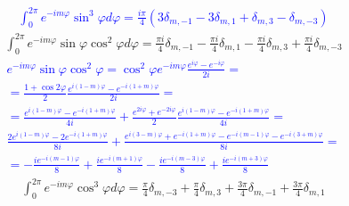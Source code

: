 %
\textcolor{blue}{ \begin{equation*} \begin{aligned}
\int_{0}^{2\pi} e^{-i m \varphi} \sin^3 \varphi d \varphi = 
\frac{i\pi}{4} \left( 3 \delta_{m,-1} - 3 \delta_{m,1} + 
\delta_{m,3} - \delta_{m,-3} \right)
\end{aligned} \end{equation*} }
%
\begin{equation} \begin{aligned} \label{eq:int_exp5}
\int_0^{2\pi} e^{-i m \varphi} \sin \varphi \cos^2 \varphi d \varphi = 
\frac{\pi i }{4} \delta_{m,-1} - \frac{\pi i }{4} \delta_{m,1} -
\frac{\pi i }{4} \delta_{m,3} + \frac{\pi i }{4} \delta_{m,-3}
\end{aligned} \end{equation}
%
\textcolor{blue}{ \begin{equation*} \begin{aligned}
e^{-i m \varphi} \sin \varphi \cos^2 \varphi = 
\cos^2 \varphi e^{-i m \varphi} \frac{e^{i\varphi} - e^{-i\varphi}}{2i} = \\
= \frac{1 + \cos 2\varphi}{2} 
\frac{e^{i(1-m)\varphi} - e^{-i(1+m)\varphi}}{2i} = \\
= \frac{e^{i(1-m)\varphi} - e^{-i(1+m)\varphi}}{4i} + 
\frac{e^{2i\varphi} + e^{-2i\varphi}}{2} 
\frac{e^{i(1-m)\varphi} - e^{-i(1+m)\varphi}}{4i} = \\
\frac{ 2 e^{i(1-m)\varphi} - 2 e^{-i(1+m)\varphi}}{8i} +
\frac{e^{i(3-m)\varphi} + e^{-i(1+m)\varphi} - 
e^{-i(m-1)\varphi} - e^{-i(3+m)\varphi}}{8i} = \\
= -\frac{ i e^{-i (m-1) \varphi} }{8} + \frac{ i e^{-i (m+1) \varphi} }{8} -
\frac{ i e^{-i (m-3) \varphi} }{8} + \frac{ i e^{-i (m+3) \varphi} }{8}
\end{aligned} \end{equation*} }
%
\begin{equation} \begin{aligned} \label{eq:int_exp6}
\int_{0}^{2\pi} e^{-i m \varphi} \cos^3 \varphi d \varphi = 
\frac{\pi}{4} \delta_{m,-3} + \frac{\pi}{4} \delta_{m,3} + 
\frac{3 \pi}{4} \delta_{m,-1} + \frac{3 \pi}{4} \delta_{m,1}
\end{aligned} \end{equation}
%
